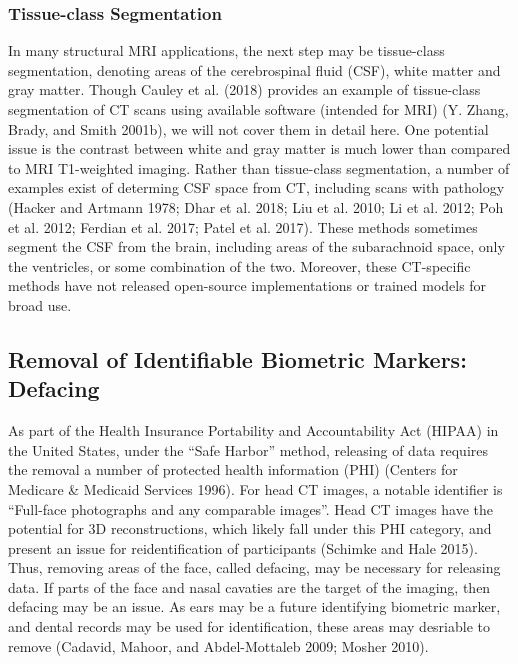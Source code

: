 \documentclass[]{elsarticle} %
\begin{document}
\hypertarget{tissue-class-segmentation}{%
\subsubsection{Tissue-class Segmentation}\label{tissue-class-segmentation}}

In many structural MRI applications, the next step may be tissue-class segmentation, denoting areas of the cerebrospinal fluid (CSF), white matter and gray matter. Though Cauley et al. (2018) provides an example of tissue-class segmentation of CT scans using available software (intended for MRI) (Y. Zhang, Brady, and Smith 2001b), we will not cover them in detail here. One potential issue is the contrast between white and gray matter is much lower than compared to MRI T1-weighted imaging. Rather than tissue-class segmentation, a number of examples exist of determing CSF space from CT, including scans with pathology (Hacker and Artmann 1978; Dhar et al. 2018; Liu et al. 2010; Li et al. 2012; Poh et al. 2012; Ferdian et al. 2017; Patel et al. 2017). These methods sometimes segment the CSF from the brain, including areas of the subarachnoid space, only the ventricles, or some combination of the two. Moreover, these CT-specific methods have not released open-source implementations or trained models for broad use.

\hypertarget{removal-of-identifiable-biometric-markers-defacing}{%
\subsection{Removal of Identifiable Biometric Markers: Defacing}\label{removal-of-identifiable-biometric-markers-defacing}}

As part of the Health Insurance Portability and Accountability Act (HIPAA) in the United States, under the ``Safe Harbor'' method, releasing of data requires the removal a number of protected health information (PHI) (Centers for Medicare \& Medicaid Services 1996). For head CT images, a notable identifier is ``Full-face photographs and any comparable images''. Head CT images have the potential for 3D reconstructions, which likely fall under this PHI category, and present an issue for reidentification of participants (Schimke and Hale 2015). Thus, removing areas of the face, called defacing, may be necessary for releasing data. If parts of the face and nasal cavaties are the target of the imaging, then defacing may be an issue. As ears may be a future identifying biometric marker, and dental records may be used for identification, these areas may desriable to remove (Cadavid, Mahoor, and Abdel-Mottaleb 2009; Mosher 2010).
\end{document}

